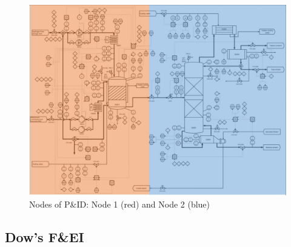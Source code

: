 \begin{figure}[H]%
\includegraphics[width=\linewidth]{chapters/5-safety-layout-environment/figures/Node.jpg}
\caption{Nodes of P\&ID: Node 1 (red) and Node 2 (blue)}
\label{fig:node}
\end{figure}


\subsection{Dow's F\&EI}
\label{app:F&EI}

